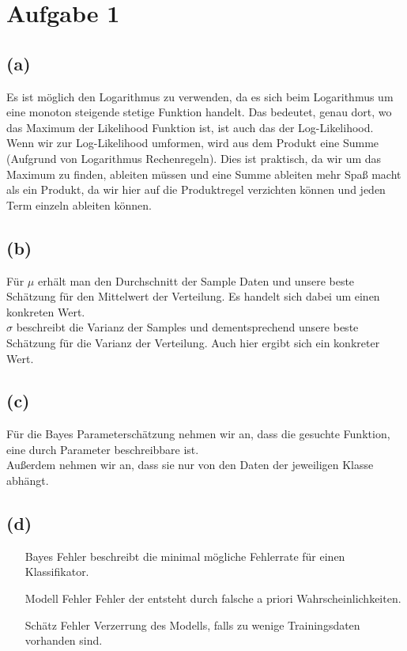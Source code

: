 \documentclass[a4paper]{scrartcl}
\begin{document}
\section*{Aufgabe 1}
\subsection*{(a)}
Es ist möglich den Logarithmus zu verwenden, da es sich beim Logarithmus um eine monoton steigende stetige Funktion handelt. Das bedeutet, genau dort, wo das Maximum der Likelihood Funktion ist, ist auch das der Log-Likelihood.\\
Wenn wir zur Log-Likelihood umformen, wird aus dem Produkt eine Summe (Aufgrund von Logarithmus Rechenregeln). Dies ist praktisch, da wir um das Maximum zu finden, ableiten müssen und eine Summe ableiten mehr Spaß macht als ein Produkt, da wir hier auf die Produktregel verzichten können und jeden Term einzeln ableiten können.


\subsection*{(b)}
Für $\mu$ erhält man den Durchschnitt der Sample Daten und unsere beste Schätzung für den Mittelwert der Verteilung. Es handelt sich dabei um einen konkreten Wert.\\
$\sigma$ beschreibt die Varianz der Samples und dementsprechend unsere beste Schätzung für die Varianz der Verteilung. Auch hier ergibt sich ein konkreter Wert.



\subsection*{(c)}
Für die Bayes Parameterschätzung nehmen wir an, dass die gesuchte Funktion, eine durch Parameter beschreibbare ist.\\
Außerdem nehmen wir an, dass sie nur von den Daten der jeweiligen Klasse abhängt.
\\

\subsection*{(d)}
\begin{itemize}
	\item[Bayes Fehler] beschreibt die minimal mögliche Fehlerrate für einen Klassifikator.\\
	\item[Modell Fehler] Fehler der entsteht durch falsche a priori Wahrscheinlichkeiten.\\
	\item[Schätz Fehler] Verzerrung des Modells, falls zu wenige Trainingsdaten vorhanden sind.
\end{itemize}
\end{document}
